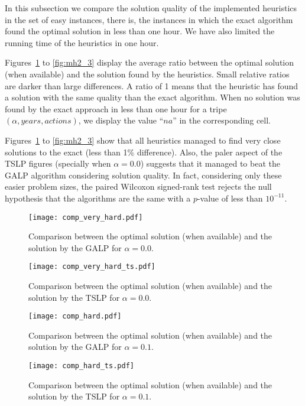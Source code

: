 In this subsection we compare the solution quality of the implemented heuristics
in the set of easy instances, there is, the instances in which the exact algorithm
found the optimal solution in less than one hour. We have also limited the running time
of the heuristics in one hour.

Figures~\ref{fig:mh1_1} to \ref{fig:mh2_3} display the average ratio between the optimal solution (when available) 
and the solution found by the heuristics. 
Small relative ratios are darker than large differences.
A ratio of 1 means that the heuristic has found a solution with the same quality
than the exact algorithm.
When no solution was found by the exact approach in less than one hour for 
a tripe $(\alpha, years, actions)$, we display the value ``$na$'' in
the corresponding cell.

Figures~\ref{fig:mh1_1} to \ref{fig:mh2_3} show that all heuristics managed
to find very close solutions to the exact (less than 1\% difference).
Also, the paler aspect of the TSLP figures (specially when $\alpha=0.0$) suggests that
it managed to beat the GALP algorithm considering solution quality.
In fact, considering only these easier problem sizes, the paired Wilcoxon signed-rank test \cite{japkowicz2011evaluating} rejects the null hypothesis
that the algorithms are the same with a $p$-value of less than $10^{-11}$.

\begin{figure}
\centering
\texttt{[image: comp\_very\_hard.pdf]}
\caption{Comparison between the optimal solution (when available) 
and the solution by the GALP for $\alpha=0.0$.}
\label{fig:mh1_1}
\end{figure}

\begin{figure}
\centering
\texttt{[image: comp\_very\_hard\_ts.pdf]}
\caption{Comparison between the optimal solution (when available) 
and the solution by the TSLP for $\alpha=0.0$.}
\label{fig:mh2_1}
\end{figure} 

\begin{figure}
\centering
\texttt{[image: comp\_hard.pdf]}
\caption{Comparison between the optimal solution (when available) 
and the solution by the GALP for $\alpha=0.1$.}
\label{fig:mh1_2}
\end{figure}

\begin{figure}
\centering
\texttt{[image: comp\_hard\_ts.pdf]}
\caption{Comparison between the optimal solution (when available) 
and the solution by the TSLP for $\alpha=0.1$.}
\label{fig:mh2_2}
\end{figure}
 
